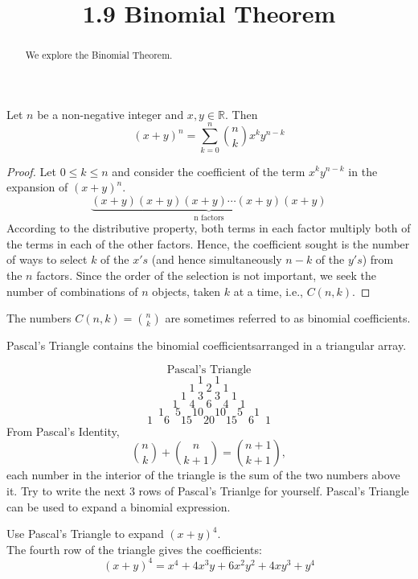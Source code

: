 \documentclass[handout]{ximera}
\title{1.9 Binomial Theorem}
\begin{document}
\begin{abstract}
We explore the Binomial Theorem.
\end{abstract}

\maketitle




\begin{theorem}
Let $n$ be a non-negative integer and $x, y \in \mathbb{R}$. Then
\[
(x+y)^n = \sum_{k=0}^n \binom{n}{k} x^ky^{n-k}
\]
\end{theorem}

\begin{proof}
Let $0 \leq k \leq n$ and consider the coefficient of the term $x^ky^{n-k}$ in the expansion of $(x+y)^n$.
\[
\underbrace{(x+y) (x+y) (x+y) \cdots (x+y) (x+y)}_{\mbox{n factors}}
\]
According to the distributive property, both terms in each factor multiply both of the terms in each of the other factors.
Hence, the coefficient sought is the number of ways to select $k$ of the $x's$ 
(and hence simultaneously $n-k$ of the $y's$) from the $n$ factors. 
Since the order of the selection is not important, we seek the number of combinations of $n$ objects, 
taken $k$ at a time, i.e., $C(n, k)$. 
\end{proof}

\begin{remark}
The numbers $C(n,k) = \binom{n}{k}$ are sometimes referred to as binomial coefficients.
\end{remark}

Pascal's Triangle contains the binomial coefficientsarranged in a triangular array.

\[
\mbox{Pascal's Triangle}
\]
\[
1 \quad 1
\]
\[
1\quad 2 \quad1
\]
\[
1\quad 3 \quad 3 \quad 1 
\]
\[
1\quad 4\quad 6\quad 4\quad 1
\]
\[
1\quad 5\quad 10\quad 10\quad 5\quad 1 
\]
\[
1\quad 6 \quad 15 \quad 20 \quad 15\quad 6 \quad 1
\]
From Pascal's Identity,
\[
\binom{n}{k} + \binom{n}{k+1} = \binom{n+1}{k+1},
\]
each number in the interior of the triangle is the sum of the two numbers above it.
Try to write the next 3 rows of Pascal's Trianlge for yourself.
Pascal's Triangle can be used to expand a  binomial expression.

\begin{example}[example 1]
Use Pascal's Triangle to expand $(x+y)^4$.\\
The fourth row of the triangle gives the coefficients:
\[
(x+y)^4 = x^4 + 4x^3y + 6x^2y^2 + 4xy^3 + y^4
\]
\end{example}
\end{document}
